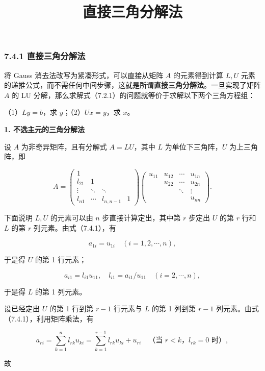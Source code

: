 \documentclass[
  10pt,
  fontset=fandol]{ctexart}
\title{直接三角分解法}
\author{}
\date{}
\begin{document}
\maketitle

\subsubsection{7.4.1 直接三角分解法}\label{ux76f4ux63a5ux4e09ux89d2ux5206ux89e3ux6cd5}

将 Gauss 消去法改写为紧凑形式，可以直接从矩阵 \(A\) 的元素得到计算 \(L,U\) 元素的递推公式，而不需任何中间步骤，这就是所谓\textbf{直接三角分解法}。一旦实现了矩阵 \(A\) 的 LU 分解，那么求解式（7.2.1）的问题就等价于求解以下两个三角方程组：

（1）\(Ly=b\)，求 \(y\)；（2）\(Ux=y\)，求 \(x\)。

\textbf{1. 不选主元的三角分解法}

设 \(A\) 为非奇异矩阵，且有分解式 \(A=LU\)，其中 \(L\) 为单位下三角阵，\(U\) 为上三角阵，即

\[
A=\begin{pmatrix}
1&&&\\
l_{21}&1&&\\
\vdots&\ddots&\ddots&\\
l_{n1}&\cdots&l_{n,n-1}&1
\end{pmatrix}
\begin{pmatrix}
u_{11}&u_{12}&\cdots&u_{1n}\\
&u_{22}&\cdots&u_{2n}\\
&&\ddots&\vdots\\
&&&u_{nn}
\end{pmatrix}.
\tag{7.4.1}
\]

下面说明 \(L,U\) 的元素可以由 \(n\) 步直接计算定出，其中第 \(r\) 步定出 \(U\) 的第 \(r\) 行和 \(L\) 的第 \(r\) 列元素。由式（7.4.1），有

\[a_{1i}=u_{1i}\quad(i=1,2,\cdots,n),\]

于是得 \(U\) 的第 1 行元素；

\[a_{i1}=l_{i1}u_{11},\quad l_{i1}=a_{i1}/u_{11}\quad(i=2,\cdots,n),\]

于是得 \(L\) 的第 1 列元素。

设已经定出 \(U\) 的第 1 行到第 \(r-1\) 行元素与 \(L\) 的第 1 列到第 \(r-1\) 列元素。由式（7.4.1），利用矩阵乘法，有

\[a_{ri}=\sum_{k=1}^{n}l_{rk}u_{ki}=\sum_{k=1}^{r-1}l_{rk}u_{ki}+u_{ri}\quad\text{（当 $r<k$，$l_{rk}=0$ 时）},\]

故
\end{document}
